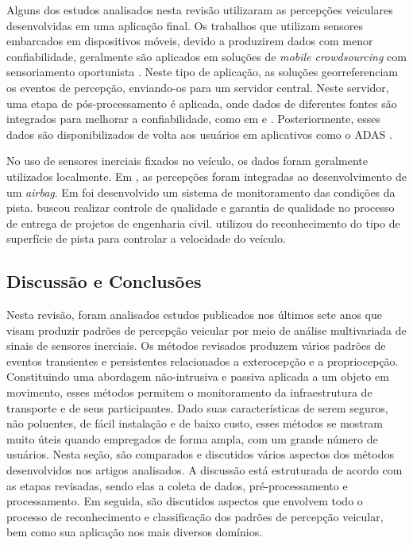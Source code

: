Alguns dos estudos analisados nesta revisão utilizaram as percepções veiculares desenvolvidas em uma aplicação final. Os trabalhos que utilizam sensores embarcados em dispositivos móveis, devido a produzirem dados com menor confiabilidade, geralmente são aplicados em soluções de \textit{mobile crowdsourcing} com sensoriamento oportunista \cite{Afrin2015,Ghadge2015,Kaur2017,Kumar2017,Li2018,Lima2016,Pooja2017,Rishiwal2016,Savera2016,Singh2017, Strutu2013,Vittorio2014}. Neste tipo de aplicação, as soluções georreferenciam os eventos de percepção, enviando-os para um servidor central. Neste servidor, uma etapa de pós-processamento é aplicada, onde dados de diferentes fontes são integrados para melhorar a confiabilidade, como em \cite{Gawad2016} e \cite{Pooja2017}. Posteriormente, esses dados são disponibilizados de volta aos usuários em aplicativos como o ADAS \cite{Afrin2015,Akhtar2014,Nalavde2015}.

No uso de sensores inerciais fixados no veículo, os dados foram geralmente utilizados localmente. Em \cite{Selmanaj2014}, as percepções foram integradas ao desenvolvimento de um \textit{airbag}. Em \cite{Tomiyama2016} foi desenvolvido um sistema de monitoramento das condições da pista. \cite{Pitonak2016} buscou realizar controle de qualidade e garantia de qualidade no processo de entrega de projetos de engenharia civil. \cite{Khaleghian2017} utilizou do reconhecimento do tipo de superfície de pista para controlar a velocidade do veículo.

\subsection{Discussão e Conclusões}

Nesta revisão, foram analisados estudos publicados nos últimos sete anos que visam produzir padrões de percepção veicular por meio de análise multivariada de sinais de sensores inerciais. Os métodos revisados produzem vários padrões de eventos transientes e persistentes relacionados a exterocepção e a propriocepção. Constituindo uma abordagem não-intrusiva e passiva aplicada a um objeto em movimento, esses métodos permitem o monitoramento da infraestrutura de transporte e de seus participantes. Dado suas características de serem seguros, não poluentes, de fácil instalação e de baixo custo, esses métodos se mostram muito úteis quando empregados de forma ampla, com um grande número de usuários. Nesta seção, são comparados e discutidos vários aspectos dos métodos desenvolvidos nos artigos analisados. A discussão está estruturada de acordo com as etapas revisadas, sendo elas a coleta de dados, pré-processamento e processamento. Em seguida, são discutidos aspectos que envolvem todo o processo de reconhecimento e classificação dos padrões de percepção veicular, bem como sua aplicação nos mais diversos domínios.

